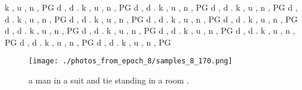 \documentclass{article}%
\begin{document}
k , u , n , PG d , d .\newline%
k , u , n , PG d , d .\newline%
k , u , n , PG d , d .\newline%
k , u , n , PG d , d .\newline%
k , u , n , PG d , d .\newline%
k , u , n , PG d , d .\newline%
k , u , n , PG d , d .\newline%
k , u , n , PG d , d .\newline%
k , u , n , PG d , d .\newline%
k , u , n , PG d , d .\newline%
k , u , n , PG d , d .\newline%
k , u , n , PG d , d .\newline%
k , u , n , PG d , d .\newline%
k , u , n , PG

%


\begin{figure}[h!]%
\centering%
\texttt{[image: ./photos\_from\_epoch\_8/samples\_8\_170.png]}%
\caption{a man in a suit and tie standing in a room .}%
\end{figure}

%
\end{document}
